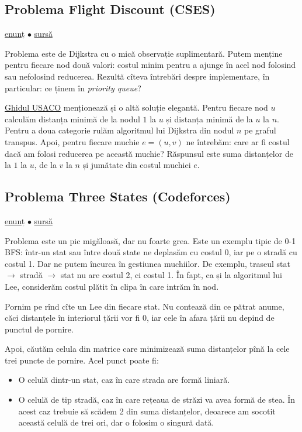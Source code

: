 \documentclass[../main.tex]{subfiles}
\begin{document}
\subsection{Problema Flight Discount (CSES)}
\label{problem:flight-discount}

\href{https://cses.fi/problemset/task/1195}{enunț}
$\bullet$
\hyperref[code:flight-discount]{sursă}

Problema este de Dijkstra cu o mică observație suplimentară. Putem menține pentru fiecare nod două valori: costul minim pentru a ajunge în acel nod folosind sau nefolosind reducerea. Rezultă cîteva întrebări despre implementare, în particular: ce ținem în \textit{priority queue}?

\href{https://usaco.guide/problems/cses-1195-flight-discount/solution}{Ghidul USACO} menționează și o altă soluție elegantă. Pentru fiecare nod $u$ calculăm distanța minimă de la nodul $1$ la $u$ și distanța minimă de la $u$ la $n$. Pentru a doua categorie rulăm algoritmul lui Dijkstra din nodul $n$ pe graful transpus. Apoi, pentru fiecare muchie $e = (u,v)$ ne întrebăm: care ar fi costul dacă am folosi reducerea pe această muchie? Răspunsul este suma distanțelor de la $1$ la $u$, de la $v$ la $n$ și jumătate din costul muchiei $e$.

\subsection{Problema Three States (Codeforces)}
\label{problem:three-states}

\href{https://codeforces.com/contest/590/problem/C}{enunț}
$\bullet$
\hyperref[code:three-states]{sursă}

Problema este un pic migăloasă, dar nu foarte grea. Este un exemplu tipic de 0-1 BFS: într-un stat sau între două state ne deplasăm cu costul 0, iar pe o stradă cu costul 1. Dar ne putem încurca în gestiunea muchiilor. De exemplu, traseul stat $\to$ stradă $\to$ stat nu are costul 2, ci costul 1. În fapt, ca și la algoritmul lui Lee, considerăm costul plătit în clipa în care intrăm în nod.

Pornim pe rînd cîte un Lee din fiecare stat. Nu contează din ce pătrat anume, căci distanțele în interiorul țării vor fi 0, iar cele în afara țării nu depind de punctul de pornire.

Apoi, căutăm celula din matrice care minimizează suma distanțelor pînă la cele trei puncte de pornire. Acel punct poate fi:

\begin{itemize}
  \item O celulă dintr-un stat, caz în care strada are formă liniară.

  \item O celulă de tip stradă, caz în care rețeaua de străzi va avea formă de stea. În acest caz trebuie să scădem 2 din suma distanțelor, deoarece am socotit această celulă de trei ori, dar o folosim o singură dată.
\end{itemize}
\end{document}
